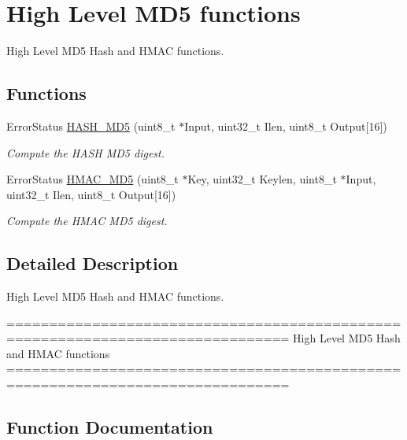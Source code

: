 \hypertarget{group___h_a_s_h___group7}{}\section{High Level M\+D5 functions}
\label{group___h_a_s_h___group7}


High Level M\+D5 Hash and H\+M\+A\+C functions.  


\subsection*{Functions}
\begin{DoxyCompactItemize}
\item 
Error\+Status \hyperlink{group___h_a_s_h___group7_ga82a155884e458cc6b7c1a4565c1ac8e9}{H\+A\+S\+H\+\_\+\+M\+D5} (uint8\+\_\+t $\ast$Input, uint32\+\_\+t Ilen, uint8\+\_\+t Output\mbox{[}16\mbox{]})
\begin{DoxyCompactList}\small\item\em Compute the H\+A\+S\+H M\+D5 digest. \end{DoxyCompactList}\item 
Error\+Status \hyperlink{group___h_a_s_h___group7_gac61733e7aa66bdd2f21be4b34165b5be}{H\+M\+A\+C\+\_\+\+M\+D5} (uint8\+\_\+t $\ast$Key, uint32\+\_\+t Keylen, uint8\+\_\+t $\ast$Input, uint32\+\_\+t Ilen, uint8\+\_\+t Output\mbox{[}16\mbox{]})
\begin{DoxyCompactList}\small\item\em Compute the H\+M\+A\+C M\+D5 digest. \end{DoxyCompactList}\end{DoxyCompactItemize}


\subsection{Detailed Description}
High Level M\+D5 Hash and H\+M\+A\+C functions. 

\begin{DoxyVerb} ===============================================================================
                          High Level MD5 Hash and HMAC functions
 ===============================================================================\end{DoxyVerb}
 

\subsection{Function Documentation}
\hypertarget{group___h_a_s_h___group7_ga82a155884e458cc6b7c1a4565c1ac8e9}{}
